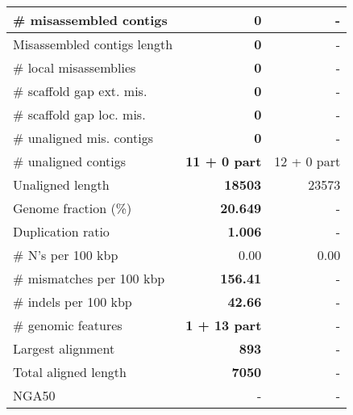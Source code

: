 \documentclass[12pt,a4paper]{article}
\begin{document}
\begin{table}[ht]
\begin{center}
\begin{tabular}{|l*{2}{|r}|}
\# misassembled contigs & {\bf 0} & - \\ \hline
Misassembled contigs length & {\bf 0} & - \\ \hline
\# local misassemblies & {\bf 0} & - \\ \hline
\# scaffold gap ext. mis. & {\bf 0} & - \\ \hline
\# scaffold gap loc. mis. & {\bf 0} & - \\ \hline
\# unaligned mis. contigs & {\bf 0} & - \\ \hline
\# unaligned contigs & {\bf 11 + 0 part} & 12 + 0 part \\ \hline
Unaligned length & {\bf 18503} & 23573 \\ \hline
Genome fraction (\%) & {\bf 20.649} & - \\ \hline
Duplication ratio & {\bf 1.006} & - \\ \hline
\# N's per 100 kbp & 0.00 & 0.00 \\ \hline
\# mismatches per 100 kbp & {\bf 156.41} & - \\ \hline
\# indels per 100 kbp & {\bf 42.66} & - \\ \hline
\# genomic features & {\bf 1 + 13 part} & - \\ \hline
Largest alignment & {\bf 893} & - \\ \hline
Total aligned length & {\bf 7050} & - \\ \hline
NGA50 & - & - \\ \hline
\end{tabular}
\end{center}
\end{table}
\end{document}
